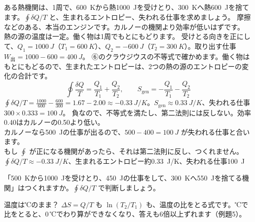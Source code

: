 \label{ph:熱-6:ex13}
\begin{phreidai}
ある熱機関は、1周で、\qty{600}{K}から熱\qty{1000}{J}を受けとり、\qty{300}{K}へ熱\qty{600}{J}を捨てます。$\oint\delta Q/T$ と、生まれるエントロピー、失われる仕事を求めましょう。
\phbamen
摩擦などのある、本当のエンジンです。カルノーの機関より効率が低いはずです。
\phmushi
熱の源の温度は一定。働く物は1周でもとにもどります。
\phzu
受けとる向きを正にして、$Q_1=\qty{1000}{J}$（$T_1=\qty{600}{K}$）、$Q_2=\qty{-600}{J}$（$T_2=\qty{300}{K}$）。取り出す仕事 $W_{\text{出}}=1000-600=\qty{400}{J}$。
\phriyu
⑥のクラウジウスの不等式で確かめます。働く物はもとにもどるので、生まれたエントロピーは、2つの熱の源のエントロピーの変化の合計です。
\phtateru
\[\oint\frac{\delta Q}{T}=\frac{Q_1}{T_1}+\frac{Q_2}{T_2},\qquad S_{\mathrm{gen}}=-\frac{Q_1}{T_1}-\frac{Q_2}{T_2}\]
\phtoku
$\oint\delta Q/T=\tfrac{1000}{600}-\tfrac{600}{300}=1.67-2.00\approx\qty{-0.33}{J/K}$。$S_{\mathrm{gen}}\approx\qty{0.33}{J/K}$、失われる仕事 $300\times0.333=\qty{100}{J}$。
\phtashikame
負なので、不等式を満たし、第二法則には反しない。効率0.40はカルノーの0.50より低い。\\
カルノーなら\qty{500}{J}の仕事が出るので、$500-400=\qty{100}{J}$ が失われる仕事と合います。\\
もし $\oint$ が正になる機関があったら、それは第二法則に反し、つくれません。
\kotae $\oint\delta Q/T\approx\qty{-0.33}{J/K}$、生まれるエントロピー約\qty{0.33}{J/K}、失われる仕事\qty{100}{J}
\end{phreidai}
\begin{jibun}
「\qty{500}{K}から\qty{1000}{J}を受けとり、\qty{450}{J}の仕事をして、\qty{300}{K}へ\qty{550}{J}を捨てる機関」はつくれますか。$\oint\delta Q/T$ で判断しましょう。
\end{jibun}

\begin{tsumazuki}{温度は℃のまま？}
$\Delta S=Q/T$ も $\ln(T_2/T_1)$ も、温度の比をとる式です。℃で比をとると、0\,℃でわり算ができなくなり、答えも6倍以上ずれます（例題5）。
\end{tsumazuki}

